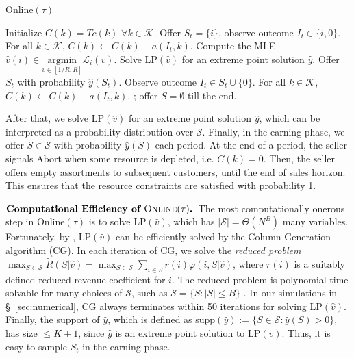 \documentclass{article}
\theoremstyle{definition}
\newcommand{\KKK}{\mathcal{K}}
\newcommand{\SSS}{\mathcal{S}}
\begin{document}
\begin{algorithm}[t]
\caption{{\sc Online}$(\tau)$}\label{alg:MNL_Learn}
\begin{algorithmic}[1]
\State Initialize $C(k) = Tc(k)$ $\forall k\in \KKK$.
 
\State Offer $S_t = \{i\}$, observe outcome $I_t\in \{i, 0\}$. 
\State For all $k\in\KKK$, $C(k) \leftarrow C(k) - a(I_t,k)$.
\EndFor
\State Compute the MLE $\hat{v}(i) \in \underset{v\in [1/R, R]}{\text{argmin}} \mathcal{L}_i(v)$. %
\EndFor
\State Solve LP$(\hat{v})$ for an extreme point solution $\hat{y}$. \label{alg:MNL_solvelp}
\State Offer $S_t$ with probability $\hat{y}(S_t)$.
\State Observe outcome $I_t\in S_t\cup \{0\}$.
\State For all $k\in \KKK$, $C(k)\leftarrow C(k) - a(I_t, k)$.
\If{$\exists k\in \KKK\text{ s.t. }C(k) = 0$}
; offer $S = \emptyset$ till the end.
\EndIf
\EndFor
\end{algorithmic}
\end{algorithm}
After that, we solve LP$(\hat{v})$ for an extreme point solution $\hat{y}$, which can be interpreted as a probability distribution over $\SSS$. Finally, in the earning phase, we offer $S\in \SSS$ with probability $\hat{y}(S)$ each period. At the end of a period, the seller signals {\sc Abort} when some resource is depleted, i.e. $C(k)=0$. Then, the seller offers empty assortments to subsequent customers, until the end of sales horizon. This ensures that the resource constraints are satisfied with probability 1. %

$\textbf{Computational Efficiency of {\sc Online}$(\tau)$. }$The most computationally onerous step in {\sc Online$(\tau)$} is to solve LP$(\hat{v})$, which has $|\SSS| = \Theta(N^B)$ many variables. Fortunately, by \cite{LiuV08}, LP$(\hat{v})$ can be efficiently solved by the Column Generation algorithm (CG). In each iteration of CG, we solve the \emph{reduced problem} $\max_{S\in \SSS}\tilde{R}(S | \hat{v}) = \max_{S\in \SSS}\sum_{i\in S}\tilde{r}(i)\varphi(i, S | \hat{v})$, where $\tilde{r}(i)$ is a suitably defined reduced revenue coefficient for $i$. The reduced problem is polynomial time solvable for many choices of $\SSS$, such as $\SSS = \{S : |S|\leq B\}$ \cite{RusmevichientongSS10}. In our simulations in \S~\ref{sec:numerical}, CG always terminates within 50 iterations for solving LP$(\hat{v})$. Finally, the support of $\hat{y}$, which is defined as supp$(\hat{y}) := \{S\in \SSS : \hat{y}(S) > 0\}$, has size $\leq K+1$, since $\hat{y}$ is an extreme point solution to LP$(v)$. Thus, it is easy to sample $S_t$ in the earning phase. 
\end{document}

